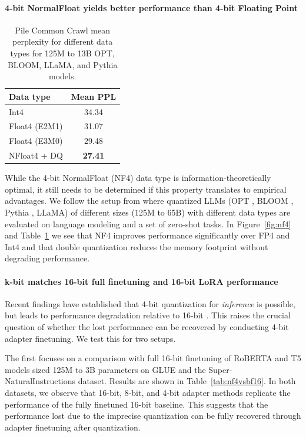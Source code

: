 \paragraph{4-bit NormalFloat yields better performance than 4-bit Floating Point} 

\begin{table}
\centering
\caption{Pile Common Crawl mean perplexity for different data types for 125M to 13B OPT, BLOOM, LLaMA, and Pythia models. 
}
\label{tbl:nf4_ppl}
\begin{tabular}{lc}\toprule
Data type & Mean PPL \\\midrule
Int4 & 34.34 \\
Float4 (E2M1) & 31.07 \\
Float4 (E3M0) & 29.48 \\
NFloat4 + DQ & \textbf{27.41}\\\bottomrule
\end{tabular}
\end{table}


While the 4-bit NormalFloat (NF4) data type is information-theoretically optimal, it still needs to be determined if this property translates to empirical advantages. We follow the setup from \citet{dettmers2022case} where quantized LLMs (OPT \citep{zhang2022opt}, BLOOM \cite{scao2022bloom}, Pythia \cite{biderman2023pythia}, LLaMA) of different sizes (125M to 65B) with different data types are evaluated on language modeling and a set of zero-shot tasks. In Figure~\ref{fig:nf4} and Table~\ref{tbl:nf4_ppl} we see that NF4 improves performance significantly over FP4 and Int4 and that double quantization reduces the memory footprint without degrading performance.

\paragraph{k-bit \method matches 16-bit full finetuning and 16-bit LoRA performance}
Recent findings have established that 4-bit quantization for \emph{inference} is possible, but leads to performance degradation relative to 16-bit \citep{dettmers2022case,frantar2022gptq}. This raises the crucial question of whether the lost performance can be recovered by conducting 4-bit adapter finetuning. We test this for two setups. 

The first focuses on a comparison with full 16-bit finetuning of RoBERTA and T5 models sized 125M to 3B parameters on GLUE and the Super-NaturalInstructions dataset. Results are shown in Table~\ref{tab:nf4vsbf16}. In both datasets, we observe that 16-bit, 8-bit, and 4-bit adapter methods replicate the performance of the fully finetuned 16-bit baseline. This suggests that the performance lost due to the imprecise quantization can be fully recovered through adapter finetuning after quantization.

